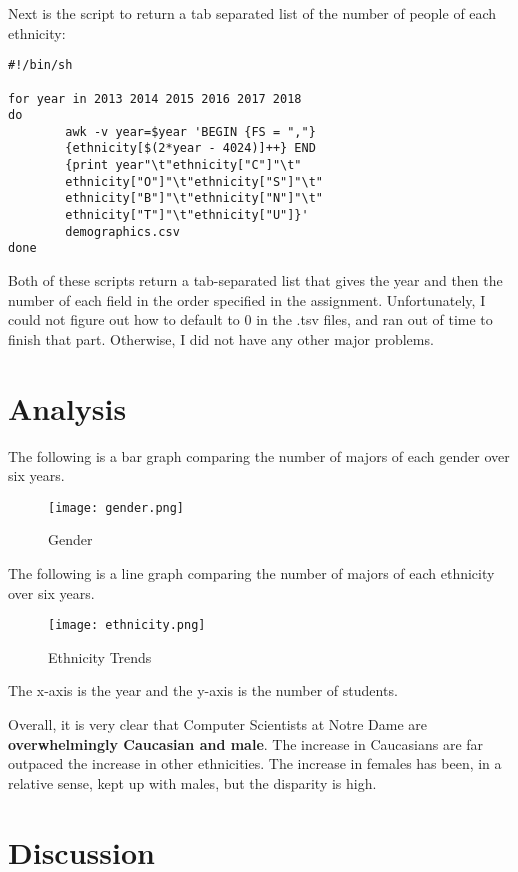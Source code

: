 \documentclass{article}
\begin{document}
Next is the script to return a tab separated list of the number of people of each ethnicity:

\begin{verbatim}
#!/bin/sh

for year in 2013 2014 2015 2016 2017 2018
do
        awk -v year=$year 'BEGIN {FS = ","} 
        {ethnicity[$(2*year - 4024)]++} END 
        {print year"\t"ethnicity["C"]"\t"
        ethnicity["O"]"\t"ethnicity["S"]"\t"
        ethnicity["B"]"\t"ethnicity["N"]"\t"
        ethnicity["T"]"\t"ethnicity["U"]}' 
        demographics.csv
done
\end{verbatim}

Both of these scripts return a tab-separated list that gives the year and then the number of each field in the order specified in the assignment.  Unfortunately, I could not figure out how to default to 0 in the .tsv files, and ran out of time to finish that part.  Otherwise, I did not have any other major problems.

\section{Analysis}

The following is a bar graph comparing the number of majors of each gender over six years.

\begin{figure}[!h]
\centering
\texttt{[image: gender.png]}
\caption{Gender}
\label{fig:gender}
\end{figure}

The following is a line graph comparing the number of majors of each ethnicity over six years.

\begin{figure}[!h]
\centering
\texttt{[image: ethnicity.png]}
\caption{Ethnicity Trends}
\label{fig:ethnicity}
\end{figure}

The x-axis is the year and the y-axis is the number of students.

Overall, it is very clear that Computer Scientists at Notre Dame are \textbf{overwhelmingly Caucasian and male}. The increase in Caucasians are far outpaced the increase in other ethnicities.  The increase in females has been, in a relative sense, kept up with males, but the disparity is high.

\section{Discussion}
\end{document}
